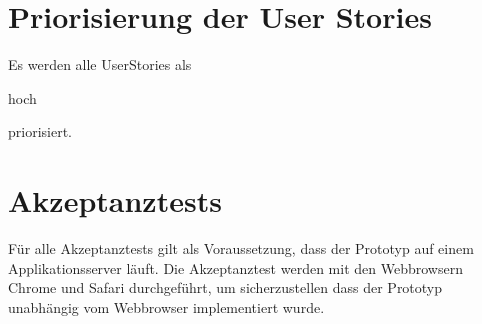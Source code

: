 \section{Priorisierung der User Stories}

Es werden alle UserStories als \begin{itshape}hoch\end{itshape} priorisiert.

\section{Akzeptanztests}

Für alle Akzeptanztests gilt als Voraussetzung, dass der Prototyp auf einem
Applikationsserver läuft. Die Akzeptanztest werden mit den Webbrowsern Chrome
und Safari durchgeführt, um sicherzustellen dass der Prototyp unabhängig vom
Webbrowser implementiert wurde.

